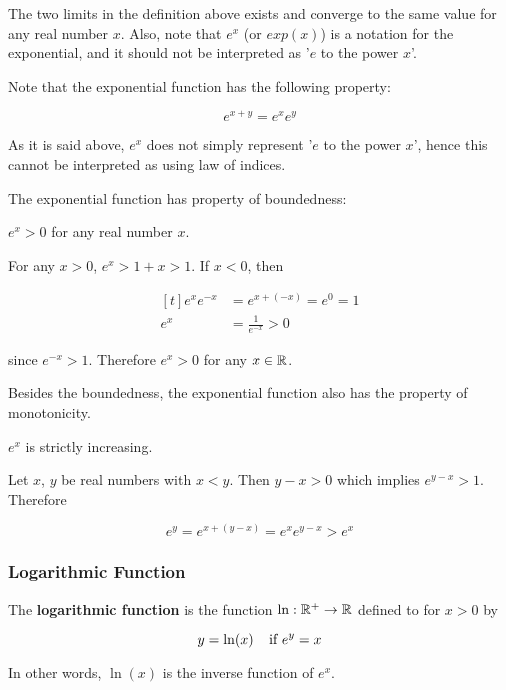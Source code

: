\documentclass[a4paper,12pt]{article}
\begin{document}
The two limits in the definition above exists and converge to the same value for any real number $x$. Also, note that $e^{x}$ (or $exp(x)$) is a notation for the exponential, and it should not be interpreted as '$e$ to the power $x$'.\n

Note that the exponential function has the following property:

$$e^{x+y}=e^{x}e^{y}$$\s

As it is said above, $e^{x}$ does not simply represent '$e$ to the power $x$', hence this cannot be interpreted as using law of indices.\n

The exponential function has property of boundedness:\n

\begin{pst}
  $e^{x}>0$ for any real number $x$.\n

  \prf For any $x>0$, $e^{x}>1+x>1$. If $x<0$, then

  $$\begin{aligned}[t]
    e^{x}e^{-x}&=e^{x+(-x)}=e^{0}=1\\
    e^{x}&=\frac{1}{e^{-x}}>0
  \end{aligned}$$\s

  since $e^{-x}>1$. Therefore $e^{x}>0$ for any $x\in \mathbb{R}$.
\end{pst}\n

Besides the boundedness, the exponential function also has the property of monotonicity.\n

\begin{pst}
  $e^{x}$ is strictly increasing.\n

  \prf Let $x$, $y$ be real numbers with $x<y$. Then $y-x>0$ which implies $e^{y-x}>1$. Therefore

  $$e^{y}=e^{x+(y-x)}=e^{x}e^{y-x}>e^{x}$$
\end{pst}

\subsubsection{Logarithmic Function}
\begin{dft}
  The \textbf{logarithmic function} is the function $\ln:\mathbb{R}^{+}\to\mathbb{R}$ defined to for $x>0$ by

  $$y=\ln(x)\;\;\;\;\text{if }e^{y}=x$$
\end{dft}\n

In other words, $\ln(x)$ is the inverse function of $e^{x}$.\n
\end{document}
